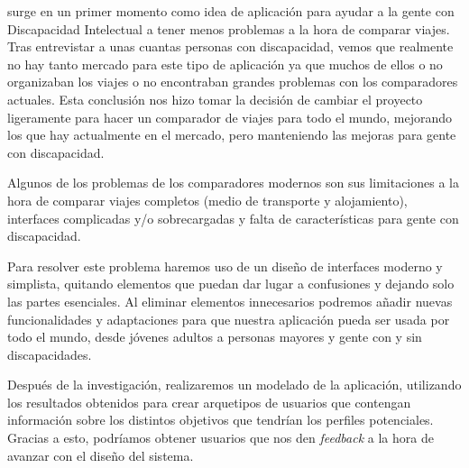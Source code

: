 
\textit{\app} surge en un primer momento como idea de aplicación para ayudar a la gente con Discapacidad Intelectual a tener menos problemas a la hora de comparar viajes.
Tras entrevistar a unas cuantas personas con discapacidad, vemos que realmente no hay tanto mercado para este tipo de aplicación ya que muchos de ellos o no organizaban los viajes o no encontraban grandes problemas con los comparadores actuales.
Esta conclusión nos hizo tomar la decisión de cambiar el proyecto ligeramente para hacer un comparador de viajes para todo el mundo, mejorando los que hay actualmente en el mercado, pero manteniendo las mejoras para gente con discapacidad.

Algunos de los problemas de los comparadores modernos son sus limitaciones a la hora de comparar viajes completos (medio de transporte y alojamiento), interfaces complicadas y/o sobrecargadas y falta de características para gente con discapacidad.

Para resolver este problema haremos uso de un diseño de interfaces moderno y simplista, quitando elementos que puedan dar lugar a confusiones y dejando solo las partes esenciales. Al eliminar elementos innecesarios podremos añadir nuevas funcionalidades y adaptaciones para que nuestra aplicación pueda ser usada por todo el mundo, desde jóvenes adultos a personas mayores y gente con y sin discapacidades.

Después de la investigación, realizaremos un modelado de la aplicación, utilizando los resultados obtenidos para crear arquetipos de usuarios que
contengan información sobre los distintos objetivos que tendrían los perfiles potenciales. Gracias a esto, podríamos obtener usuarios que nos den
\textit{feedback} a la hora de avanzar con el diseño del sistema.
